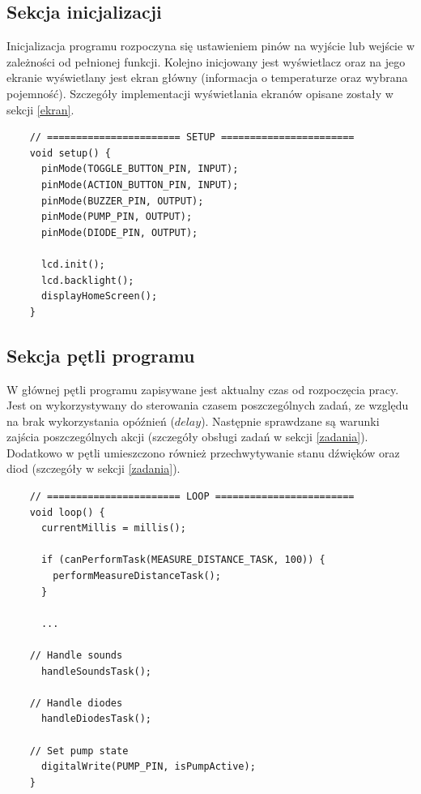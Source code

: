 \documentclass[11pt]{article}
\begin{document}
\subsection{Sekcja inicjalizacji}
Inicjalizacja programu rozpoczyna się ustawieniem pinów na wyjście lub wejście w zależności od pełnionej funkcji. Kolejno inicjowany jest wyświetlacz oraz na jego ekranie wyświetlany jest ekran główny (informacja o temperaturze oraz wybrana pojemność). Szczegóły implementacji wyświetlania ekranów opisane zostały w sekcji \ref{ekran}.
\begin{verbatim}
    // ======================= SETUP =======================
    void setup() {
      pinMode(TOGGLE_BUTTON_PIN, INPUT);
      pinMode(ACTION_BUTTON_PIN, INPUT);
      pinMode(BUZZER_PIN, OUTPUT);
      pinMode(PUMP_PIN, OUTPUT);
      pinMode(DIODE_PIN, OUTPUT);

      lcd.init();
      lcd.backlight();
      displayHomeScreen();
    }
\end{verbatim}

\subsection{Sekcja pętli programu}
W głównej pętli programu zapisywane jest aktualny czas od rozpoczęcia pracy. Jest on wykorzystywany do sterowania czasem poszczególnych zadań, ze względu na brak wykorzystania opóźnień ($delay$). Następnie sprawdzane są warunki zajścia poszczególnych akcji (szczegóły obsługi zadań w sekcji \ref{zadania}). Dodatkowo w pętli umieszczono również przechwytywanie stanu dźwięków oraz diod (szczegóły w sekcji \ref{zadania}).
\begin{verbatim}
    // ======================= LOOP ========================
    void loop() { 
      currentMillis = millis();
    
      if (canPerformTask(MEASURE_DISTANCE_TASK, 100)) {
        performMeasureDistanceTask();
      }

      ...

    // Handle sounds
      handleSoundsTask();
    
    // Handle diodes
      handleDiodesTask();
    
    // Set pump state
      digitalWrite(PUMP_PIN, isPumpActive);
    }
\end{verbatim}
\end{document}
